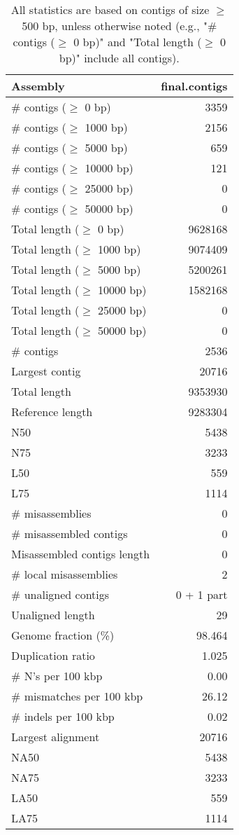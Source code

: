 \documentclass[12pt,a4paper]{article}
\begin{document}
\begin{table}[ht]
\begin{center}
\caption{All statistics are based on contigs of size $\geq$ 500 bp, unless otherwise noted (e.g., "\# contigs ($\geq$ 0 bp)" and "Total length ($\geq$ 0 bp)" include all contigs).}
\begin{tabular}{|l*{1}{|r}|}
\hline
Assembly & final.contigs \\ \hline
\# contigs ($\geq$ 0 bp) & 3359 \\ \hline
\# contigs ($\geq$ 1000 bp) & 2156 \\ \hline
\# contigs ($\geq$ 5000 bp) & 659 \\ \hline
\# contigs ($\geq$ 10000 bp) & 121 \\ \hline
\# contigs ($\geq$ 25000 bp) & 0 \\ \hline
\# contigs ($\geq$ 50000 bp) & 0 \\ \hline
Total length ($\geq$ 0 bp) & 9628168 \\ \hline
Total length ($\geq$ 1000 bp) & 9074409 \\ \hline
Total length ($\geq$ 5000 bp) & 5200261 \\ \hline
Total length ($\geq$ 10000 bp) & 1582168 \\ \hline
Total length ($\geq$ 25000 bp) & 0 \\ \hline
Total length ($\geq$ 50000 bp) & 0 \\ \hline
\# contigs & 2536 \\ \hline
Largest contig & 20716 \\ \hline
Total length & 9353930 \\ \hline
Reference length & 9283304 \\ \hline
N50 & 5438 \\ \hline
N75 & 3233 \\ \hline
L50 & 559 \\ \hline
L75 & 1114 \\ \hline
\# misassemblies & 0 \\ \hline
\# misassembled contigs & 0 \\ \hline
Misassembled contigs length & 0 \\ \hline
\# local misassemblies & 2 \\ \hline
\# unaligned contigs & 0 + 1 part \\ \hline
Unaligned length & 29 \\ \hline
Genome fraction (\%) & 98.464 \\ \hline
Duplication ratio & 1.025 \\ \hline
\# N's per 100 kbp & 0.00 \\ \hline
\# mismatches per 100 kbp & 26.12 \\ \hline
\# indels per 100 kbp & 0.02 \\ \hline
Largest alignment & 20716 \\ \hline
NA50 & 5438 \\ \hline
NA75 & 3233 \\ \hline
LA50 & 559 \\ \hline
LA75 & 1114 \\ \hline
\end{tabular}
\end{center}
\end{table}
\end{document}
